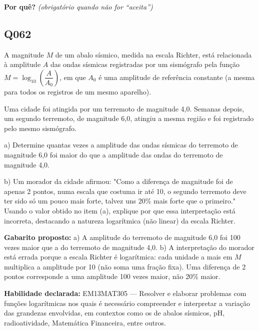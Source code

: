 \documentclass[11pt,a4paper]{article}
\begin{document}
\textbf{Por quê?} \emph{(obrigatório quando não for ``aceita'')}

\underline{\hspace{\linewidth}}

\underline{\hspace{\linewidth}}
\vspace{0.6em}

\begin{samepage}
\subsection*{Q062}
A magnitude $M$ de um abalo sísmico, medida na escala Richter, está relacionada à amplitude $A$ das ondas sísmicas registradas por um sismógrafo pela função $M = \log_{10}\left(\dfrac{A}{A_0}\right)$, em que $A_0$ é uma amplitude de referência constante (a mesma para todos os registros de um mesmo aparelho).

Uma cidade foi atingida por um terremoto de magnitude 4,0. Semanas depois, um segundo terremoto, de magnitude 6,0, atingiu a mesma região e foi registrado pelo mesmo sismógrafo.

a) Determine quantas vezes a amplitude das ondas sísmicas do terremoto de magnitude 6,0 foi maior do que a amplitude das ondas do terremoto de magnitude 4,0.

b) Um morador da cidade afirmou: "Como a diferença de magnitude foi de apenas 2 pontos, numa escala que costuma ir até 10, o segundo terremoto deve ter sido só um pouco mais forte, talvez uns 20\% mais forte que o primeiro." Usando o valor obtido no item (a), explique por que essa interpretação está incorreta, destacando a natureza logarítmica (não linear) da escala Richter.

\textbf{Gabarito proposto:} a) A amplitude do terremoto de magnitude 6,0 foi 100 vezes maior que a do terremoto de magnitude 4,0. b) A interpretação do morador está errada porque a escala Richter é logarítmica: cada unidade a mais em $M$ multiplica a amplitude por 10 (não soma uma fração fixa). Uma diferença de 2 pontos corresponde a uma amplitude 100 vezes maior, não 20\% maior.

\textbf{Habilidade declarada:} EM13MAT305 --- Resolver e elaborar problemas com funções logarítmicas nos quais é necessário compreender e interpretar a variação das grandezas envolvidas, em contextos como os de abalos sísmicos, pH, radioatividade, Matemática Financeira, entre outros.
\end{samepage}
\end{document}
